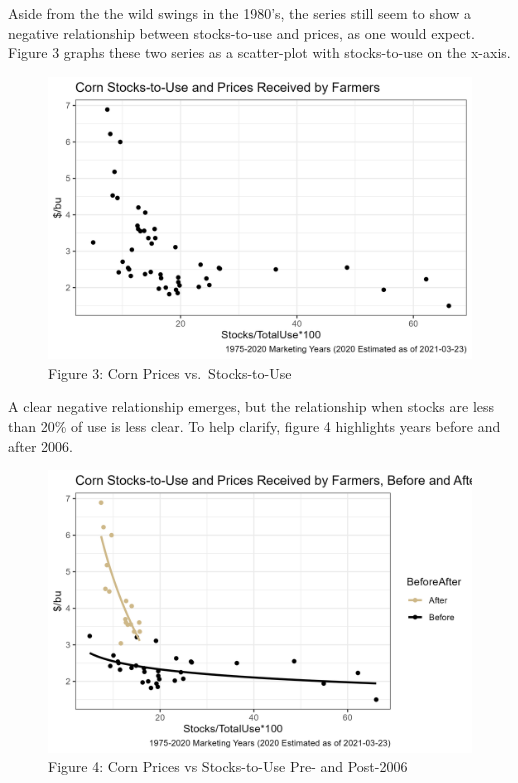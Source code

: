 \documentclass[
  letterpaper,
  DIV=11,
  numbers=noendperiod]{scrreprt}
\begin{document}
Aside from the the wild swings in the 1980's, the series still seem to
show a negative relationship between stocks-to-use and prices, as one
would expect. Figure 3 graphs these two series as a scatter-plot with
stocks-to-use on the x-axis.

\begin{figure}

{\centering \includegraphics{assets/EndingStocksand-StocksUsePrices2.png}

}

\caption{Figure 3: Corn Prices vs.~Stocks-to-Use}

\end{figure}

A clear negative relationship emerges, but the relationship when stocks
are less than 20\% of use is less clear. To help clarify, figure 4
highlights years before and after 2006.

\begin{figure}

{\centering \includegraphics{assets/EndingStocksand-StocksUsePrices3.png}

}

\caption{Figure 4: Corn Prices vs Stocks-to-Use Pre- and Post-2006}

\end{figure}
\end{document}
